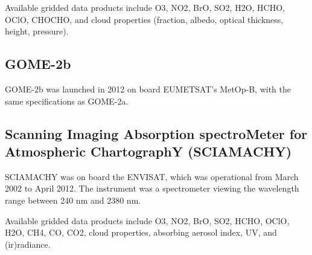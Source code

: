 Available gridded data products include O3, NO2, BrO, SO2, H2O, HCHO, OClO, CHOCHO, and cloud properties (fraction, albedo, optical thickness, height, pressure).

\subsection{GOME-2b}

GOME-2b was launched in 2012 on board EUMETSAT's MetOp-B, with the same specifications as GOME-2a.

\subsection{Scanning Imaging Absorption spectroMeter for Atmospheric ChartographY (SCIAMACHY)}

SCIAMACHY was on board the ENVISAT, which was operational from March 2002 to April 2012.
The instrument was a spectrometer viewing the wavelength range between 240 nm and 2380 nm. 

Available gridded data products include O3, NO2, BrO, SO2, HCHO, OClO, H2O, CH4, CO, CO2, cloud properties, absorbing aerosol index, UV, and (ir)radiance.


  